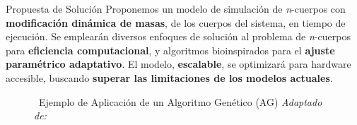 \begin{frame}{Propuesta de Solución}%
    \vspace{-0.15cm}
    {\fontsize{8pt}{10pt}\selectfont
    Proponemos un modelo de simulación de \textit{n}-cuerpos con \textbf{modificación dinámica de masas}, de los cuerpos del sistema, en tiempo de ejecución. Se emplearán diversos enfoques de solución al problema de \textit{n}-cuerpos para \textbf{eficiencia computacional}, y algoritmos bioinspirados para el \textbf{ajuste paramétrico adaptativo}. El modelo, \textbf{escalable}, se optimizará para hardware accesible, buscando \textbf{superar las limitaciones de los modelos actuales}.}
    \vspace{-0.1cm}
    \begin{figure}[H]
        \centering
        \vspace{-0.25cm}
        \caption{\tiny~Ejemplo de Aplicación de un Algoritmo Genético (AG) \textit{Adaptado de:}~\cite{Kim2021}}%
        \label{fig:genetic_algorithm_application}
    \end{figure}
\end{frame}

